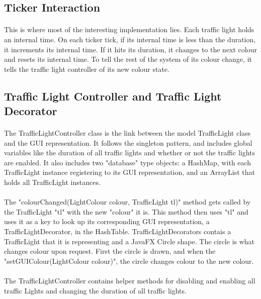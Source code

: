 \documentclass[a4paper,11pt,titlepage]{article}
\begin{document}
\subsection{Ticker Interaction}
\paragraph{}
This is where most of the interesting implementation lies. Each traffic light holds an internal time. On each ticker tick, if its internal time is less than the duration, it increments its internal time. If it hits its duration, it changes to the next colour and resets its internal time. To tell the rest of the system of its colour change, it tells the traffic light controller of its new colour state.

\subsection{Traffic Light Controller and Traffic Light Decorator}
\paragraph{}
The TrafficLightController class is the link between the model TrafficLight class and the GUI representation. It follows the singleton pattern, and includes global variables like the duration of all traffic lights and whether or not the traffic lights are enabled. It also includes two "database" type objects: a HashMap, with each TrafficLight instance registering to its GUI representation, and an ArrayList that holds all TrafficLight instances.
\paragraph{}
The "colourChanged(LightColour colour, TrafficLight tl)" method gets called by the TrafficLight "tl" with the new "colour" it is. This method then uses "tl" and uses it as a key to look up its corresponding GUI representation, a TrafficLightDecorator, in the HashTable. TrafficLightDecorators contais a TrafficLight that it is representing and a JavaFX Circle shape. The circle is what changes colour upon request. First the circle is drawn, and when the "setGUIColour(LightColour colour)", the circle changes colour to the new colour.
\paragraph{}
The TrafficLightController contains helper methods for disabling and enabling all traffic Lights and changing the duration of all traffic lights.
\end{document}
